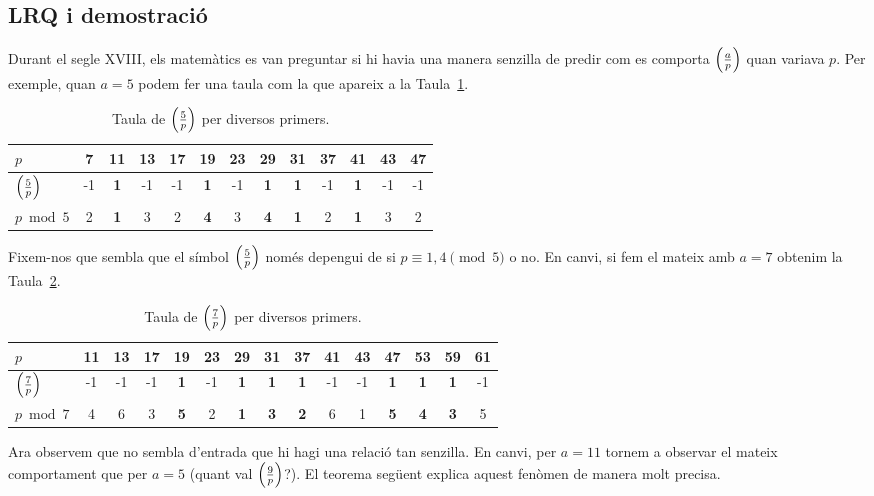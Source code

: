 \subsection{LRQ i demostració}

Durant el segle XVIII, els matemàtics es van preguntar si hi havia una manera senzilla de predir com es comporta $\left(\frac{a}{p}\right)$ quan variava $p$. Per exemple, quan $a=5$ podem fer una taula com la que apareix a la Taula~\ref{taula:lrq}.
\begin{table}[ht]
\centering
\label{taula:lrq}
\begin{tabular}{lcccccccccccc}
\toprule
    $p$ & 7  & \textbf{11} & 13 & 17 & \textbf{19} & 23 & \textbf{29} & \textbf{31} & 37 & \textbf{41} & 43 & 47\\
    \midrule
    $\left(\frac{5}{p}\right)$& -1& \textbf{1}& -1 & -1 & \textbf{1} & -1 & \textbf{1} & \textbf{1} & -1 & \textbf{1} & -1 & -1\\
    $p\bmod 5$ & 2 & \textbf{1} & 3 & 2 & \textbf{4} & 3 &\textbf{4} & \textbf{1} & 2 &\textbf{1} & 3 & 2\\
    \bottomrule
\end{tabular}
\caption{Taula de $\left(\frac{5}{p}\right)$ per diversos primers.}
\end{table}
Fixem-nos que sembla que el símbol $\left(\frac{5}{p}\right)$ només depengui de si $p\equiv 1,4\pmod{5}$ o no. En canvi, si fem el mateix amb $a=7$ obtenim la Taula~\ref{taula:lrq2}.
\begin{table}[ht]
\label{taula:lrq2}
\centering

\begin{tabular}{lcccccccccccccc}
\toprule
    $p$ & 11 & 13 & 17 & \textbf{19} & 23 & \textbf{29} & \textbf{31} & \textbf{37} & 41 & 43 & \textbf{47}&\textbf{53}&\textbf{59}&61\\
\midrule
    $\left(\frac{7}{p}\right)$& -1& -1& -1 & \textbf{1} & -1 & \textbf{1} & \textbf{1} & \textbf{1} & -1 & -1 & \textbf{1} & \textbf{1} & \textbf{1}&-1\\
    $p\bmod 7$ & 4 & 6 & 3 & \textbf{5} & 2& \textbf{1} & \textbf{3} & \textbf{2} & 6 & 1 & \textbf{5} & \textbf{4} & \textbf{3}&5\\
\bottomrule
\end{tabular}

\caption{Taula de $\left(\frac{7}{p}\right)$ per diversos primers.}

\end{table}
Ara observem que no sembla d'entrada que hi hagi una relació tan senzilla. En canvi, per $a=11$ tornem a observar el mateix comportament que per $a=5$ (quant val $\left(\frac{9}{p}\right)$?). El teorema següent explica aquest fenòmen de manera molt precisa.

